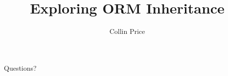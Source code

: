\documentclass{beamer}
\title[ORM Inheritance]{Exploring ORM Inheritance}
\author{Collin Price}
\begin{document}
	

\begin{frame}
	\titlepage
\end{frame}

\begin{frame}
	\Huge{\centerline{Questions?}}
\end{frame}
\end{document}

